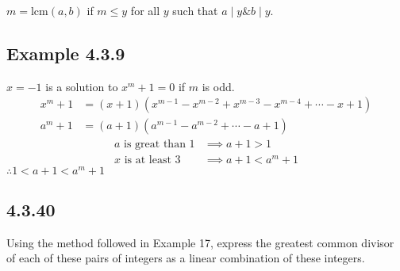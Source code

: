 \documentclass{article}
\begin{document}
$ m = \text{lcm}(a, b) $ if $ m \leq y $ for all $ y $ such that $ a \mid y \& b \mid y $.

\subsection{Example 4.3.9}

$ x = -1 $ is a solution to $ x^m + 1 = 0 $ if $ m $ is odd.
\begin{align*}
	x^m + 1 & = \left( x + 1 \right) \left( x^{m - 1} - x^{m - 2} + x^{m - 3} - x^{m - 4} + \cdots - x + 1 \right) \\
	a^m + 1 & = \left( a + 1 \right) \left( a^{m - 1} - a^{m - 2} + \cdots - a + 1 \right)
\end{align*}
\begin{align*}
	a \text{ is great than } 1 & \implies a + 1 > 1       \\
	x \text{ is at least } 3   & \implies a + 1 < a^m + 1
\end{align*}
$ \therefore 1 < a + 1 < a^m + 1 $

\subsection{4.3.40}

Using the method followed in Example 17, express the greatest common divisor of each of these pairs of integers as a linear combination of these integers.
\end{document}
